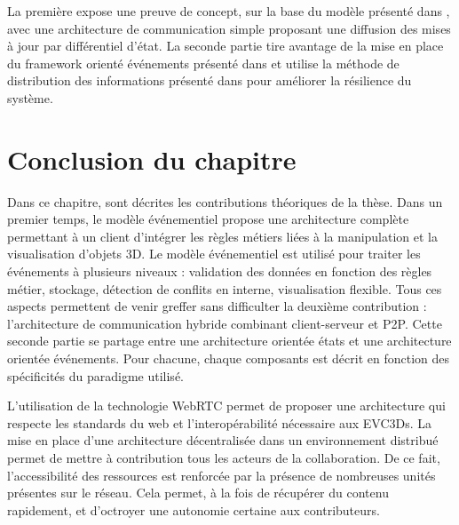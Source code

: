 La première expose une preuve de concept, sur la base du modèle présenté dans 
\cite{Desprat2015a}, avec une architecture de communication simple proposant 
une diffusion des mises à jour par différentiel d'état. La seconde partie 
tire avantage de la mise en place du \gls{framework} orienté événements présenté 
dans \cite{Desprat2016} et utilise la méthode de distribution des informations 
présenté dans \cite{Desprat2017} pour améliorer la résilience du système. 








\section{Conclusion du chapitre}
Dans ce chapitre, sont décrites les contributions théoriques de la thèse. 
Dans un premier temps, le modèle événementiel propose une architecture 
complète permettant à un client d'intégrer les règles métiers liées à la manipulation 
et la visualisation d'objets 3D. Le modèle événementiel est utilisé pour traiter les 
événements à plusieurs niveaux : validation des données en fonction des règles 
métier, stockage, détection de conflits en interne, visualisation flexible. Tous ces 
aspects permettent de venir greffer sans difficulter la deuxième contribution : 
l'architecture de communication hybride combinant client-serveur et \gls{P2P}.
Cette seconde partie se partage entre une architecture \og orientée états\fg{} et 
une architecture \og orientée événements\fg{}. Pour chacune, chaque composants 
est décrit en fonction des spécificités du paradigme utilisé. 

L'utilisation de la 
technologie WebRTC permet de proposer une 
architecture qui respecte les standards du web et l'interopérabilité nécessaire aux \glspl{EVC3D}. La mise en place d'une architecture décentralisée dans un 
environnement distribué permet de mettre à contribution tous les acteurs de la 
collaboration. De ce fait, l'accessibilité des ressources est renforcée par la 
présence de nombreuses unités présentes sur le réseau. Cela permet, à la fois 
de récupérer du contenu rapidement, et d'octroyer une autonomie certaine aux 
contributeurs. 

